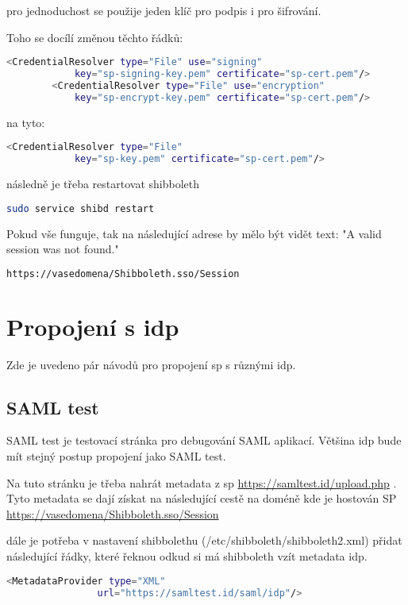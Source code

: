 pro jednoduchost se použije jeden klíč pro podpis i pro šifrování.

Toho se docílí změnou těchto řádků:
\begin{lstlisting}[language=Bash]
<CredentialResolver type="File" use="signing"
            key="sp-signing-key.pem" certificate="sp-cert.pem"/>
        <CredentialResolver type="File" use="encryption"
            key="sp-encrypt-key.pem" certificate="sp-cert.pem"/>
\end{lstlisting}

na tyto:
\begin{lstlisting}[language=Bash]
<CredentialResolver type="File"
            key="sp-key.pem" certificate="sp-cert.pem"/>
\end{lstlisting}

následně je třeba restartovat shibboleth
\begin{lstlisting}[language=Bash]
sudo service shibd restart
\end{lstlisting}

Pokud vše funguje, tak na následující adrese by mělo být vidět text: "A valid session was not found."
\begin{lstlisting}[language=Bash]
https://vasedomena/Shibboleth.sso/Session
\end{lstlisting}

\section{Propojení s idp}

Zde je uvedeno pár návodů pro propojení sp s různými idp.

\subsection{SAML test}
SAML test je testovací stránka pro debugování SAML aplikací. Většina idp bude mít stejný postup propojení jako SAML test.



Na tuto stránku je třeba nahrát metadata z sp 
\url{https://samltest.id/upload.php}  . Tyto metadata se dají získat na následující cestě na doméně kde je hostován SP \url{https://vasedomena/Shibboleth.sso/Session }

dále je potřeba v nastavení shibbolethu (/etc/shibboleth/shibboleth2.xml) přidat následující řádky, které řeknou odkud si má shibboleth vzít metadata idp.
\begin{lstlisting}[language=Bash]
 <MetadataProvider type="XML"
                url="https://samltest.id/saml/idp"/>
\end{lstlisting}

